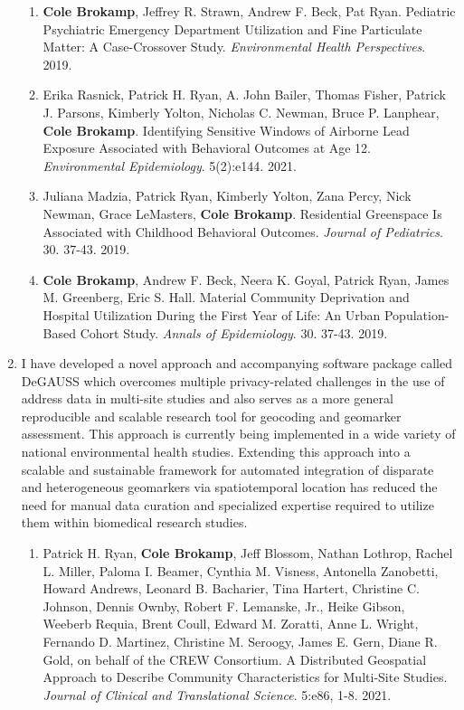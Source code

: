 \documentclass{nihbiosketch}
\begin{document}
\begin{enumerate}
  \begin{enumerate}

  \item \textbf{Cole Brokamp}, Jeffrey R. Strawn, Andrew F. Beck, Pat Ryan.
    Pediatric Psychiatric Emergency Department Utilization and Fine
    Particulate Matter: A Case-Crossover Study. \textit{Environmental Health
      Perspectives}. 2019.
 
  \item Erika Rasnick, Patrick H. Ryan, A. John Bailer, Thomas Fisher, Patrick
    J. Parsons, Kimberly Yolton, Nicholas C. Newman, Bruce P. Lanphear,
    \textbf{Cole Brokamp}. Identifying Sensitive Windows of Airborne Lead
    Exposure Associated with Behavioral Outcomes at Age 12.
    \textit{Environmental Epidemiology}. 5(2):e144. 2021.

  \item Juliana Madzia, Patrick Ryan, Kimberly Yolton, Zana Percy, Nick Newman, Grace
    LeMasters, \textbf{Cole Brokamp}. Residential Greenspace Is Associated with Childhood
    Behavioral Outcomes. \textit{Journal of Pediatrics}. 30. 37-43. 2019.

  \item \textbf{Cole Brokamp}, Andrew F. Beck, Neera K. Goyal, Patrick Ryan,
    James M. Greenberg, Eric S. Hall. Material Community Deprivation and
    Hospital Utilization During the First Year of Life: An Urban
    Population-Based Cohort Study. \textit{Annals of Epidemiology}. 30. 37-43.
    2019.

  \end{enumerate}

\item I have developed a novel approach and accompanying software package called DeGAUSS
  which overcomes multiple privacy-related challenges in the use of address data in
  multi-site studies and also serves as a more general reproducible and scalable
  research tool for geocoding and geomarker assessment. This approach is currently being
  implemented in a wide variety of national environmental health studies. Extending this
  approach into a scalable and sustainable framework for automated integration of
  disparate and heterogeneous geomarkers via spatiotemporal location has reduced
  the need for manual data curation and specialized expertise required
  to utilize them within biomedical research studies.

\begin{enumerate}
	
\item Patrick H. Ryan, \textbf{Cole Brokamp}, Jeff Blossom, Nathan Lothrop,
  Rachel L. Miller, Paloma I. Beamer, Cynthia M. Visness, Antonella
  Zanobetti, Howard Andrews, Leonard B. Bacharier, Tina Hartert, Christine
  C. Johnson, Dennis Ownby, Robert F. Lemanske, Jr., Heike Gibson, Weeberb
  Requia, Brent Coull, Edward M. Zoratti, Anne L. Wright, Fernando D.
  Martinez, Christine M. Seroogy, James E. Gern, Diane R. Gold, on behalf
  of the CREW Consortium. A Distributed Geospatial Approach to Describe
  Community Characteristics for Multi-Site Studies. \textit{Journal of
    Clinical and Translational Science}. 5:e86, 1-8. 2021.


\end{enumerate}
\end{enumerate}
\end{document}
